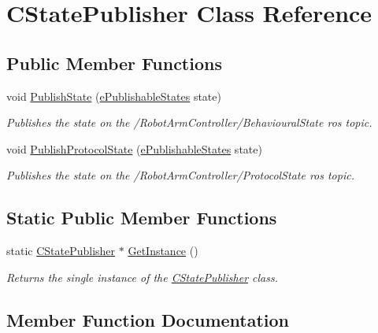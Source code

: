 \hypertarget{classCStatePublisher}{}\section{C\+State\+Publisher Class Reference}
\label{classCStatePublisher}
\subsection*{Public Member Functions}
\begin{DoxyCompactItemize}
\item 
void \hyperlink{classCStatePublisher_af7144175e8b6e553a182ef660f37616c}{Publish\+State} (\hyperlink{CStatePublisher_8h_a57ce604a7850ac5988b6182daf162fe9}{e\+Publishable\+States} state)
\begin{DoxyCompactList}\small\item\em Publishes the state on the /\+Robot\+Arm\+Controller/\+Behavioural\+State ros topic. \end{DoxyCompactList}\item 
void \hyperlink{classCStatePublisher_a0c6cde04f7712e68951bd50391c1f53e}{Publish\+Protocol\+State} (\hyperlink{CStatePublisher_8h_a57ce604a7850ac5988b6182daf162fe9}{e\+Publishable\+States} state)
\begin{DoxyCompactList}\small\item\em Publishes the state on the /\+Robot\+Arm\+Controller/\+Protocol\+State ros topic. \end{DoxyCompactList}\end{DoxyCompactItemize}
\subsection*{Static Public Member Functions}
\begin{DoxyCompactItemize}
\item 
static \hyperlink{classCStatePublisher}{C\+State\+Publisher} $\ast$ \hyperlink{classCStatePublisher_a473d257be0334c38511096fe5caded74}{Get\+Instance} ()
\begin{DoxyCompactList}\small\item\em Returns the single instance of the \hyperlink{classCStatePublisher}{C\+State\+Publisher} class. \end{DoxyCompactList}\end{DoxyCompactItemize}


\subsection{Member Function Documentation}
\mbox{\label{classCStatePublisher_a473d257be0334c38511096fe5caded74}} 
